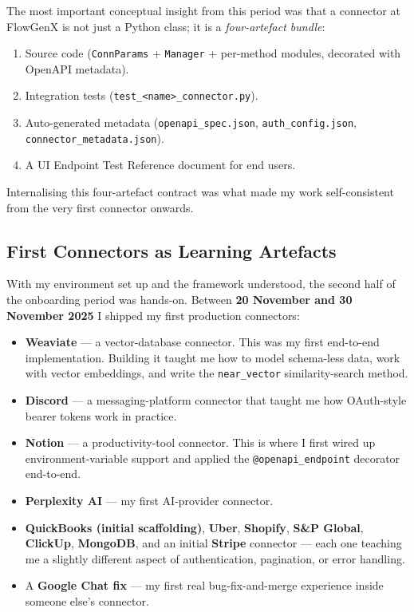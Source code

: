 The most important conceptual insight from this period was that a
connector at FlowGenX is not just a Python class; it is a
\emph{four-artefact bundle}:

\begin{enumerate}[leftmargin=*]
    \item Source code (\texttt{ConnParams} + \texttt{Manager} +
    per-method modules, decorated with OpenAPI metadata).
    \item Integration tests (\texttt{test\_<name>\_connector.py}).
    \item Auto-generated metadata
    (\texttt{openapi\_spec.json}, \texttt{auth\_config.json},
    \texttt{connector\_metadata.json}).
    \item A UI Endpoint Test Reference document for end users.
\end{enumerate}

Internalising this four-artefact contract was what made my work
self-consistent from the very first connector onwards.

\subsection{First Connectors as Learning Artefacts}
With my environment set up and the framework understood, the second
half of the onboarding period was hands-on. Between
\textbf{20 November and 30 November 2025} I shipped my first
production connectors:

\begin{itemize}[leftmargin=*]
    \item \textbf{Weaviate} --- a vector-database connector. This was
    my first end-to-end implementation. Building it taught me how to
    model schema-less data, work with vector embeddings, and write
    the \texttt{near\_vector} similarity-search method.
    \item \textbf{Discord} --- a messaging-platform connector that
    taught me how OAuth-style bearer tokens work in practice.
    \item \textbf{Notion} --- a productivity-tool connector. This is
    where I first wired up environment-variable support and applied
    the \texttt{@openapi\_endpoint} decorator end-to-end.
    \item \textbf{Perplexity AI} --- my first AI-provider connector.
    \item \textbf{QuickBooks (initial scaffolding)},
    \textbf{Uber}, \textbf{Shopify}, \textbf{S\&P Global},
    \textbf{ClickUp}, \textbf{MongoDB}, and an initial
    \textbf{Stripe} connector --- each one teaching me a slightly
    different aspect of authentication, pagination, or
    error handling.
    \item A \textbf{Google Chat fix} --- my first real
    bug-fix-and-merge experience inside someone else's connector.
\end{itemize}

